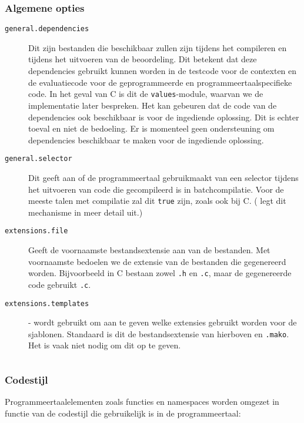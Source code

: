\subsubsection{Algemene opties}

\begin{description}
    \item[\texttt{general.dependencies}] Dit zijn bestanden die beschikbaar zullen zijn tijdens het compileren en tijdens het uitvoeren van de beoordeling.
    Dit betekent dat deze dependencies gebruikt kunnen worden in de testcode voor de contexten en de evaluatiecode voor de geprogrammeerde en programmeertaalspecifieke code.
    In het geval van C is dit de \texttt{values}-module, waarvan we de implementatie later bespreken.
    Het kan gebeuren dat de code van de dependencies ook beschikbaar is voor de ingediende oplossing.
    Dit is echter toeval en niet de bedoeling.
    Er is momenteel geen ondersteuning om dependencies beschikbaar te maken voor de ingediende oplossing.
    \item[\texttt{general.selector}] Dit geeft aan of de programmeertaal gebruikmaakt van een selector tijdens het uitvoeren van code die gecompileerd is in batchcompilatie.
    Voor de meeste talen met compilatie zal dit \texttt{true} zijn, zoals ook bij C. ( legt dit mechanisme in meer detail uit.)
    \item[\texttt{extensions.file}] Geeft de voornaamste bestandsextensie aan van de bestanden.
    Met voornaamste bedoelen we de extensie van de bestanden die gegenereerd worden.
    Bijvoorbeeld in C bestaan zowel \texttt{.h} en \texttt{.c}, maar de gegenereerde code gebruikt \texttt{.c}.
    \item[\texttt{extensions.templates}] - wordt gebruikt om aan te geven welke extensies gebruikt worden voor de sjablonen.
    Standaard is dit de bestandsextensie van hierboven en \texttt{.mako}.
    Het is vaak niet nodig om dit op te geven.
\end{description}

\inputminted[firstline=2,lastline=14,gobble=2]{js}{sources/c-config.json}

\subsubsection{Codestijl}

Programmeertaalelementen zoals functies en namespaces worden omgezet in functie van de codestijl die gebruikelijk is in de programmeertaal:

